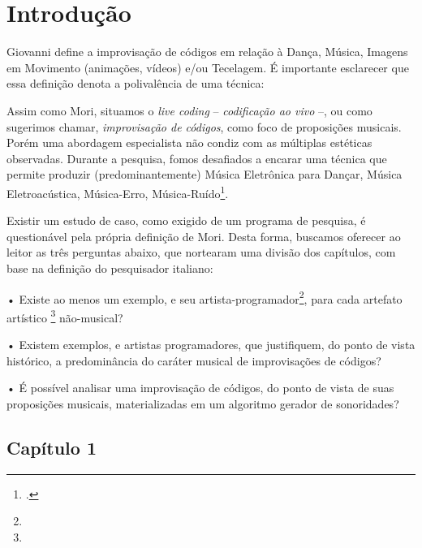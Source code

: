 \chapter*{Introdução}\label{cap:intro}

Giovanni  define a improvisação de códigos em relação à Dança, Música, Imagens em Movimento (animações, vídeos) e/ou Tecelagem. É importante esclarecer que essa definição denota a polivalência de uma técnica:


Assim como Mori, situamos o \emph{live coding} -- \emph{codificação ao vivo} --, ou como sugerimos chamar, \emph{improvisação de códigos}, como foco de proposições musicais. Porém uma abordagem especialista não condiz com as múltiplas estéticas observadas. Durante a pesquisa, fomos desafiados a encarar uma técnica que permite produzir (predominantemente) Música Eletrônica para Dançar, Música Eletroacústica, Música-Erro, Música-Ruído\footnote{.}.

Existir um estudo de caso, como exigido de um programa de pesquisa, é questionável pela própria definição de Mori. Desta forma, buscamos oferecer ao leitor as três perguntas abaixo, que nortearam uma divisão dos capítulos, com base na definição do pesquisador italiano:

• Existe ao menos um exemplo, e seu artista-programador\footnote{}, para cada artefato artístico \footnote{} não-musical?

• Existem exemplos, e artistas programadores, que justifiquem, do ponto de vista histórico, a predominância do caráter musical de improvisações de códigos?

• É possível analisar uma improvisação de códigos, do ponto de vista de suas proposições musicais, materializadas em um algoritmo gerador de sonoridades?

\section*{Capítulo 1}

